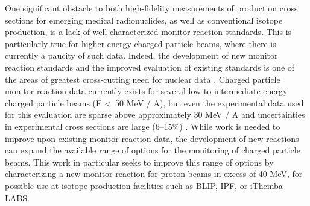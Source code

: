 \documentclass[3p]{elsarticle}
\newcommand{\comment}[1]{\todo[color=blue!20!white,inline]{ASV: #1}}
\begin{document}
One significant obstacle to both high-fidelity measurements of production cross sections for emerging medical radionuclides, as well as conventional isotope production, is a lack of well-characterized  monitor reaction standards.  
This is particularly true for higher-energy charged particle beams, where there is currently a paucity of such data. 
Indeed, the development of new monitor reaction standards and the improved evaluation of existing standards is one of the areas of greatest cross-cutting need for nuclear data \cite{bernstein2015nuclear}. 
Charged particle monitor reaction data currently exists for several low-to-intermediate energy charged particle beams (E \textless\ 50 MeV / A), but even the experimental data used for this evaluation are  sparse above approximately 30 MeV / A and  uncertainties in experimental cross sections are large (6--15\%) \cite{gul2001charged}. 
While work is needed to improve upon existing monitor reaction data, the development of new reactions can expand the available range of options for the monitoring of charged particle beams.
This work in particular seeks to improve this range of options by characterizing a new monitor reaction for  proton beams in excess of 40 MeV, for possible use at isotope production facilities such as BLIP, IPF, or iThemba LABS.
\end{document}

